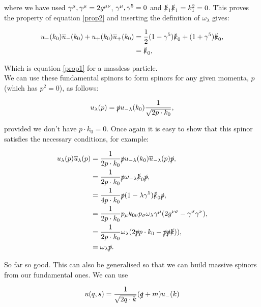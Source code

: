 	where we have used ${\gamma^{\mu}, \gamma^{\mu}}=2g^{\mu\nu}$, ${\gamma^{\mu}, \gamma^{5}}=0$ and $\slashed k_1\slashed k_1=k_1^2=0$.
	This proves the property of equation \ref{prop2} and inserting the definition of $\omega_\lambda$ gives:

	\begin{subequations}
	\begin{align*}
		u_-(k_0)\overline{u}_-(k_0) + u_+(k_0)\overline{u}_+(k_0) &= \frac{1}{2}(1-\gamma^{5})\slashed k_0 + (1+\gamma^{5})\slashed k_0,\\
		&= \slashed k_0,
	\end{align*}
	\end{subequations}

	Which is equation \ref{prop1} for a massless particle.\\We can use these fundamental spinors
	to form spinors for any given momenta, $p$ (which has $p^2=0$), as follows:

	\begin{equation}
		u_\lambda(p) = \slashed p u_{-\lambda}(k_0) \frac{1}{\sqrt{2p\cdot k_0}},
	\end{equation}

	provided we don't have $p\cdot k_0=0$.  Once again it is easy to show that this spinor satisfies the necessary conditions, for example:

	\begin{subequations}
	\begin{align*}
		u_\lambda(p)\overline{u}_\lambda(p) &= \frac{1}{2p\cdot k_0}\slashed p u_{-\lambda}(k_0)\overline{u}_{-\lambda}(p)\slashed p,\\
		&= \frac{1}{2p\cdot k_0}\slashed p \omega_{-\lambda}\slashed k_0\slashed p,\\
		&= \frac{1}{4p\cdot k_0}\slashed p (1-\lambda\gamma^{5})\slashed k_0\slashed p,\\
		&= \frac{1}{2p\cdot k_0}p_{\mu}k_{0\nu}p_{\sigma}\omega_{\lambda}\gamma^{\mu}(2g^{\nu\sigma} - \gamma^{\sigma}\gamma^{\nu}),\\
		&= \frac{1}{2p\cdot k_0}\omega_\lambda(2\slashed p p\cdot k_0 - \slashed p\slashed p\slashed k)),\\
		&= \omega_\lambda\slashed p.\\
	\end{align*}
	\end{subequations}

	So far so good.  This can also be generalised so that we can build massive spinors from our fundamental ones.  We can use

	\begin{equation}
		\label{u_def}
		u(q, s) = \frac{1}{\sqrt{2q\cdot k}}(\slashed q + m)u_-(k)
	\end{equation}

